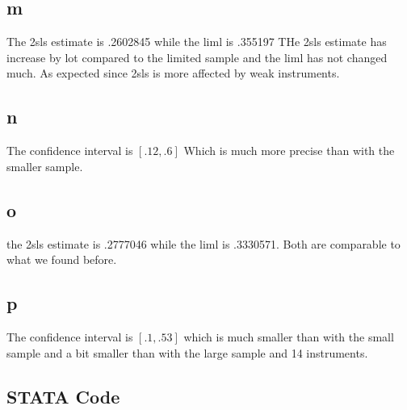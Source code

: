 \documentclass[11pt]{article}
\begin{document}
  \subsection{m}
  The 2sls estimate is .2602845  while the liml is .355197 THe 2sls estimate has increase by  lot compared to the limited sample and the liml has not changed much. As expected since 2sls is more affected by weak instruments. 
  
  \subsection{n}
  The confidence interval is $  [     .12,      .6]$ Which is much more precise than with the smaller sample. 
  
  \subsection{o}
  the 2sls estimate is .2777046  while the liml is  .3330571. Both are comparable to what we found before.
  
  \subsection{p}
  
  The confidence interval is $[      .1,     .53]$ which is much smaller than with the small sample and a bit smaller than with the large sample and 14 instruments.
  
  
  \subsection{STATA Code}
  
  
 
  
\end{document}
